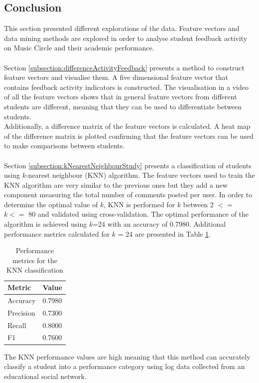 \documentclass[11pt, oneside]{article}   	%
\begin{document}
\subsection{Conclusion}
This section presented different explorations of the data. Feature vectors and data mining methods are explored in order to analyse student feedback activity on Music Circle and their academic performance.\\\\ 
Section \ref{subsection:differenceActivityFeedback} presents a method to construct feature vectors and visualise them. A five dimensional feature vector that contains feedback activity indicators is constructed. The visualisation in a video of all the feature vectors shows that in general feature vectors from different students are different, meaning that they can be used to differentiate between students.\\ Additionally, a difference matrix of the feature vectors is calculated. A heat map of the difference matrix is plotted confirming that the feature vectors can be used to make comparisons between students.\\\\ 
Section \ref{subsection:kNearestNeighbourStudy} presents a classification of students using $k$-nearest neighbour (KNN) algorithm. The feature vectors used to train the KNN algorithm are very similar to the previous ones but they add a new component measuring the total number of comments posted per user. In order to determine the optimal value of $k$, KNN is performed for $k$ between 2 $<=$ $k<=$ 80 and validated using cross-validation. The optimal performance of the algorithm is achieved using $k$=24 with an accuracy of 0.7980. Additional performance metrics calculated for $k$ = 24 are presented in Table \ref{table:performanceMetrics2}.
\newpage
\begin{table}[h]
	\centering
	\begin{tabular}{| l | l |}
		\hline
		 \textbf{Metric} & \textbf{Value} \\ \hline
		 Accuracy & 0.7980\\ \hline
		 Precision & 0.7300 \\ \hline
		 Recall & 0.8000 \\ \hline
		 F1 & 0.7600 \\ \hline
	\end{tabular}
	\caption{Performance metrics for the KNN classification}
	\label{table:performanceMetrics2}
\end{table}
\noindent The KNN performance values are high meaning that this method can accurately classify a student into a performance category using log data collected from an educational social network.\\\\
\end{document}
